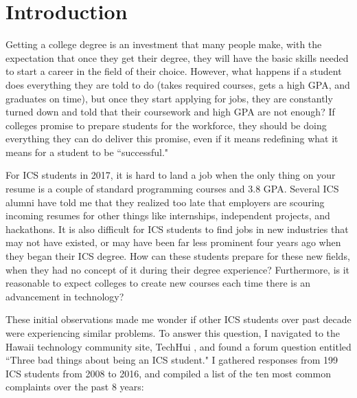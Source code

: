 \chapter{Introduction}
\label{introduction}

Getting a college degree is an investment that many people make, with the expectation that once they get their degree, they will have the basic skills needed to start a career in the field of their choice. However, what happens if a student does everything they are told to do (takes required courses, gets a high GPA, and graduates on time), but once they start applying for jobs, they are constantly turned down and told that their coursework and high GPA are not enough? If colleges promise to prepare students for the workforce, they should be doing everything they can do deliver this promise, even if it means redefining what it means for a student to be ``successful."   

For ICS students in 2017, it is hard to land a job when the only thing on your resume is a couple of standard programming courses and 3.8 GPA. Several ICS alumni have told me that they realized too late that employers are scouring incoming resumes for other things like internships, independent projects, and hackathons. It is also difficult for ICS students to find jobs in new industries that may not have existed, or may have been far less prominent four years ago when they began their ICS degree. How can these students prepare for these new fields, when they had no concept of it during their degree experience? Furthermore, is it reasonable to expect colleges to create new courses each time there is an advancement in technology?

These initial observations made me wonder if other ICS students over past decade were experiencing similar problems. To answer this question, I navigated to the Hawaii technology community site, TechHui \cite {TechHuiQuestions}, and found a forum question entitled ``Three bad things about being an ICS student." I gathered responses from 199 ICS students from 2008 to 2016, and compiled a list of the ten most common complaints over the past 8 years:

